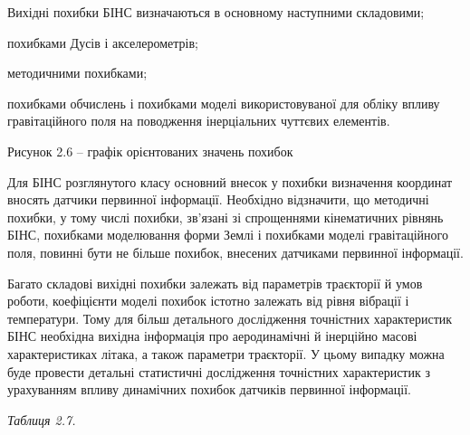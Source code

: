Вихідні похибки БІНС визначаються в основному наступними складовими;

похибками Дусів і акселерометрів;

методичними похибками;

похибками обчислень і похибками моделі використовуваної для обліку впливу гравітаційного поля на поводження інерціальних чуттєвих елементів.





Рисунок 2.6 -- графік орієнтованих значень похибок%

Для БІНС розглянутого класу основний внесок у похибки визначення координат вносять датчики первинної 
інформації. Необхідно відзначити, що методичні похибки, у тому числі похибки, зв'язані зі спрощеннями 
кінематичних рівнянь БІНС, похибками моделювання форми Землі і похибками моделі гравітаційного поля, 
повинні бути не більше  похибок, внесених датчиками первинної інформації.

Багато складові вихідні похибки залежать від параметрів траєкторії й умов роботи, коефіцієнти моделі 
похибок істотно залежать від рівня вібрації і температури. Тому для більш детального дослідження 
точністних характеристик  БІНС необхідна вихідна інформація про аеродинамічні й інерційно масові 
характеристиках літака, а також параметри траєкторії. У цьому випадку можна буде провести детальні 
статистичні дослідження точністних характеристик з урахуванням впливу динамічних похибок датчиків первинної інформації.



\textit{Таблиця 2.7.}

